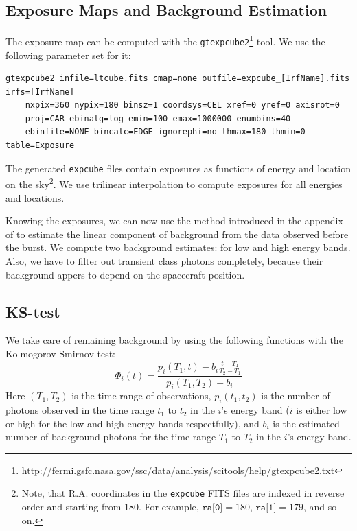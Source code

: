 \documentclass{article}
\begin{document}
\subsection{Exposure Maps and Background Estimation}

The exposure map can be computed with the \texttt{gtexpcube2}\footnote{\url{http://fermi.gsfc.nasa.gov/ssc/data/analysis/scitools/help/gtexpcube2.txt}} tool. We use the following parameter set for it:
\begin{lstlisting}
gtexpcube2 infile=ltcube.fits cmap=none outfile=expcube_[IrfName].fits irfs=[IrfName]
	nxpix=360 nypix=180 binsz=1 coordsys=CEL xref=0 yref=0 axisrot=0
	proj=CAR ebinalg=log emin=100 emax=1000000 enumbins=40
	ebinfile=NONE bincalc=EDGE ignorephi=no thmax=180 thmin=0 table=Exposure
\end{lstlisting}
The generated \texttt{expcube} files contain exposures as functions of energy and location on the sky\footnote{Note, that R.A. coordinates in the \texttt{expcube} FITS files are indexed in reverse order and starting from 180. For example, $\texttt{ra[0]}=180$, $\texttt{ra[1]}=179$, and so on.}. We use trilinear interpolation to compute exposures for all energies and locations.

Knowing the exposures, we can now use the method introduced in the appendix of \cite{Rubtsov:2011qq} to estimate the linear component of background from the data observed before the burst. We compute two background estimates: for low and high energy bands. Also, we have to filter out transient class photons completely, because their background appers to depend on the spacecraft position.

\subsection{KS-test}

We take care of remaining background by using the following functions with the Kolmogorov-Smirnov test:
\begin{equation}
	\Phi_i\left(t\right) = \frac{p_i\left(T_1, t\right) - b_i \frac{t-T_1}{T_2-T_1}}{p_i\left(T_1, T_2\right) - b_i}
\end{equation}
Here $\left(T_1, T_2\right)$ is the time range of observations, $p_i\left(t_1, t_2\right)$ is the number of photons observed in the time range $t_1$ to $t_2$ in the $i$'s energy band ($i$ is either low or high for the low and high energy bands respectfully), and $b_i$ is the estimated number of background photons for the time range $T_1$ to $T_2$ in the $i$'s energy band.
\end{document}
